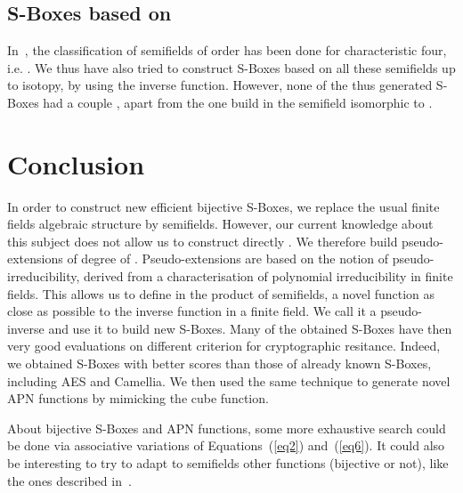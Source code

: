 \documentclass{article}\usepackage{amsthm}
\newcommand{\SBoxes}{S-Boxes\xspace}
\begin{document}
\subsection[S-Boxes based on degree 4 extensions of S(4)]{\SBoxes based on }
In~\cite{Combarro:2011:advances_sf}, the classification of semifields of order  has been
done for characteristic four, i.e. . 
We thus have also tried to construct \SBoxes based on all these 
semifields up to isotopy, by using the inverse function. However, none of the
thus generated \SBoxes had a couple ,  apart from
the one build in the semifield isomorphic to . 


\section{Conclusion}\label{sec:concl}

In order to construct new efficient  bijective \SBoxes, we replace the usual finite fields algebraic structure by semifields. However, our current knowledge about this subject does not allow us to construct directly .
We therefore build pseudo-extensions of degree  of . Pseudo-extensions are based on the notion of pseudo-irreducibility, derived from a characterisation of polynomial irreducibility in finite fields. 
This allows us to define in the product of semifields, a novel function as close
as possible to the inverse function in a finite field. We call it a
pseudo-inverse and use it to build new \SBoxes. 
Many of the obtained \SBoxes have then very good evaluations on different
criterion for cryptographic resitance. Indeed, we obtained  \SBoxes with
better scores than those of already known \SBoxes, including AES and
Camellia. 
We then used the same technique to generate  novel APN functions by mimicking the cube function. 


About bijective \SBoxes and APN functions, some more exhaustive search could be
done via associative variations
of Equations~(\ref{eq2}) and~(\ref{eq6}).
It could also be interesting to try to adapt to semifields other functions 
(bijective or not), like the ones described in~\cite[\S6]{Alvarez:2008:apn}. 








\end{document}

